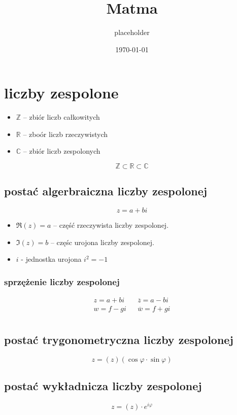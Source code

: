 \documentclass[11pt]{article}
\author{placeholder}
\date{\today}
\title{Matma}
\begin{document}
\maketitle
\tableofcontents


\section{liczby zespolone}
\label{sec:org857af50}
\begin{itemize}
\item \(\mathbb{Z}\) -- zbiór liczb całkowitych
\item \(\mathbb{R}\) -- zboór liczb rzeczywistych
\item \(\mathbb{C}\) -- zbiór liczb zespolonych
\end{itemize}
$$\mathbb{Z} \subset \mathbb{R} \subset \mathbb{C}$$
\subsection{postać algerbraiczna liczby zespolonej}
\label{sec:org75e7cb2}
$$z=a+bi$$

\begin{itemize}
\item \(\Re(z) = a\) -- część rzeczywista liczby zespolonej.
\item \(\Im(z) = b\) -- częśc urojona liczby zespolonej.
\item \(i\) - jednostka urojona \(i^2=-1\)
\end{itemize}
\subsubsection{sprzężenie liczby zespolonej}
\label{sec:org4dd9afa}
\begin{latex}
\begin{align*}
  z=a+bi && \overline{z}=a-bi \\
  w=f-gi && \overline{w}=f+gi \\
\end{align*}
\end{latex}

\subsection{postać trygonometryczna liczby zespolonej}
\label{sec:orgb9e8e59}
$$z=(z)(\cos\varphi \cdot \sin\varphi)$$
\subsection{postać wykładnicza liczby zespolonej}
\label{sec:orgf7b4168}
$$z=(z) \cdot e^{i\varphi}$$
\end{document}
